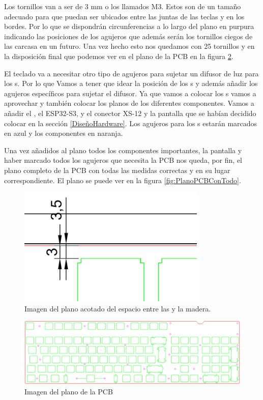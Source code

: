 Los tornillos van a ser de 3 mm o los llamados M3. Estos son de un tamaño adecuado para que puedan ser ubicados entre las juntas de las teclas y en los bordes. Por lo que se dispondrán circunferencias a lo largo del plano en purpura indicando las posiciones de los agujeros que además serán los tornillos ciegos de las carcasa en un futuro. Una vez hecho esto nos quedamos con 25 tornillos y en la disposición final que podemos ver en el plano de la \gls{PCB} en la figura \ref{fig:PlanoPCB}.

El teclado va a necesitar otro tipo de agujeros para sujetar un difusor de luz para los s. Por lo que Vamos a tener que idear la posición de los s y además añadir los agujeros específicos para sujetar el difusor. Ya que vamos a colocar los s vamos a aprovechar y también colocar los planos de los diferentes componentes. Vamos a añadir el , el ESP32-S3, y el conector XS-12 y la pantalla que se habían decidido colocar en la sección \ref{DiseñoHardware}. Los agujeros para los s estarán marcados en azul y los componentes en naranja.

Una vez añadidos al plano todos los componentes importantes, la pantalla y haber marcado todos los agujeros que necesita la \gls{PCB} nos queda, por fin, el plano completo de la \gls{PCB} con todas las medidas correctas y en su lugar correspondiente. El plano se puede ver en la figura \ref{fig:PlanoPCBConTodo}.

\begin{figure}[H]
    \centering
    \includegraphics[width=0.8\textwidth]{imagenes/Capitulos/Cap05/AcotadoPCBMadera.png}
    \caption{Imagen del plano acotado del espacio entre las  y la madera.}
    \label{fig:PlanoSeparacionMadera}
\end{figure}

\begin{figure}[H]
    \centering
    \includegraphics[width=1\textwidth]{imagenes/Capitulos/Cap05/PlanoPCB.png}
    \caption{Imagen del plano de la \gls{PCB}}
    \label{fig:PlanoPCB}
\end{figure}

